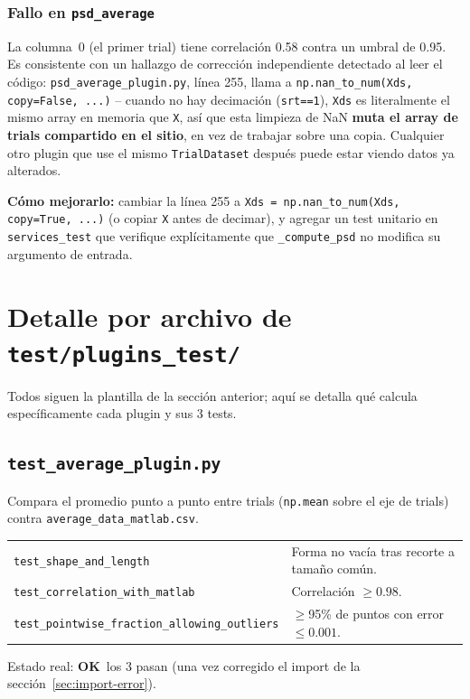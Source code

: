 \documentclass[11pt,a4paper]{article}
\newcommand{\okmark}{\textcolor{ok}{\textbf{OK}}}
\begin{document}
\subsubsection{Fallo en \texttt{psd\_\allowbreak average}}

La columna~0 (el primer trial) tiene correlación 0.58 contra un umbral de 0.95. Es consistente con un
hallazgo de corrección independiente detectado al leer el código:
\texttt{psd\_\allowbreak average\_\allowbreak plugin.py}, línea 255, llama a
\texttt{np.nan\_\allowbreak to\_\allowbreak num(Xds, copy=False, ...)} -- cuando no hay decimación (\texttt{srt==1}),
\texttt{Xds} es literalmente el mismo array en memoria que \texttt{X}, así que esta limpieza de NaN
\textbf{muta el array de trials compartido en el sitio}, en vez de trabajar sobre una copia. Cualquier otro
plugin que use el mismo \texttt{TrialDataset} después puede estar viendo datos ya alterados.

\textbf{Cómo mejorarlo:} cambiar la línea 255 a
\texttt{Xds = np.nan\_\allowbreak to\_\allowbreak num(Xds, copy=True, ...)} (o copiar \texttt{X} antes de decimar), y agregar un test
unitario en \texttt{services\_\allowbreak test} que verifique explícitamente que \texttt{\_\allowbreak compute\_\allowbreak psd} no modifica su
argumento de entrada.

\newpage
\section{Detalle por archivo de \texttt{test/plugins\_\allowbreak test/}}

Todos siguen la plantilla de la sección anterior; aquí se detalla qué calcula específicamente cada plugin y
sus 3 tests.

\subsection{\texttt{test\_\allowbreak average\_\allowbreak plugin.py}}
Compara el promedio punto a punto entre trials (\texttt{np.mean} sobre el eje de trials) contra
\texttt{average\_\allowbreak data\_\allowbreak matlab.csv}.
\begin{center}
\begin{tabular}{ll}
\toprule
\texttt{test\_\allowbreak shape\_\allowbreak and\_\allowbreak length} & Forma no vacía tras recorte a tamaño común. \\
\texttt{test\_\allowbreak correlation\_\allowbreak with\_\allowbreak matlab} & Correlación $\geq 0.98$. \\
\texttt{test\_\allowbreak pointwise\_\allowbreak fraction\_\allowbreak allowing\_\allowbreak outliers} & $\geq$95\% de puntos con error $\leq 0.001$. \\
\bottomrule
\end{tabular}
\end{center}
Estado real: \okmark\ los 3 pasan (una vez corregido el import de la sección~\ref{sec:import-error}).
\end{document}
